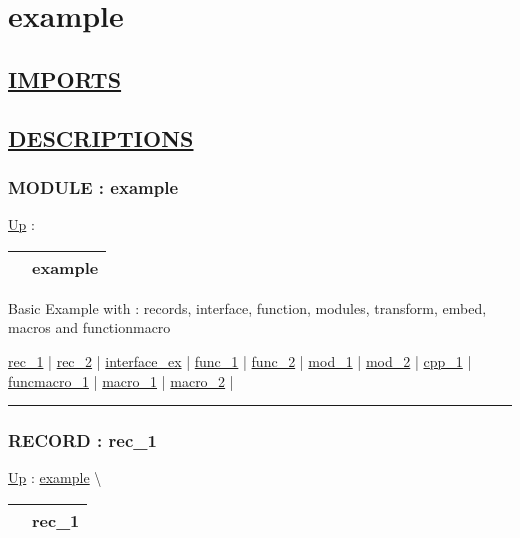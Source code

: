 \chapter*{example}
\hypertarget{ecldoc:toc:example}{}

\section*{\underline{IMPORTS}}

\section*{\underline{DESCRIPTIONS}}
\subsection*{MODULE : example}
\hypertarget{ecldoc:example}{}
\hyperlink{ecldoc:toc:root}{Up} :

{\renewcommand{\arraystretch}{1.5}
\begin{tabularx}{\textwidth}{|>{\raggedright\arraybackslash}l|X|}
\hline
\hspace{0pt} & example \\
\hline
\end{tabularx}
}

\par
Basic Example with : records, interface, function, modules, transform, embed, macros and functionmacro


\hyperlink{ecldoc:example.rec_1}{rec\_1}  |
\hyperlink{ecldoc:example.rec_2}{rec\_2}  |
\hyperlink{ecldoc:example.interface_ex}{interface\_ex}  |
\hyperlink{ecldoc:example.func_1}{func\_1}  |
\hyperlink{ecldoc:example.func_2}{func\_2}  |
\hyperlink{ecldoc:example.mod_1}{mod\_1}  |
\hyperlink{ecldoc:example.mod_2}{mod\_2}  |
\hyperlink{ecldoc:example.cpp_1}{cpp\_1}  |
\hyperlink{ecldoc:example.funcmacro_1}{funcmacro\_1}  |
\hyperlink{ecldoc:example.macro_1}{macro\_1}  |
\hyperlink{ecldoc:example.macro_2}{macro\_2}  |

\rule{\linewidth}{0.5pt}

\subsection*{RECORD : rec\_1}
\hypertarget{ecldoc:example.rec_1}{}
\hyperlink{ecldoc:example}{Up} :
\hspace{0pt} \hyperlink{ecldoc:example}{example} \textbackslash 

{\renewcommand{\arraystretch}{1.5}
\begin{tabularx}{\textwidth}{|>{\raggedright\arraybackslash}l|X|}
\hline
\hspace{0pt} & rec\_1 \\
\hline
\end{tabularx}
}

